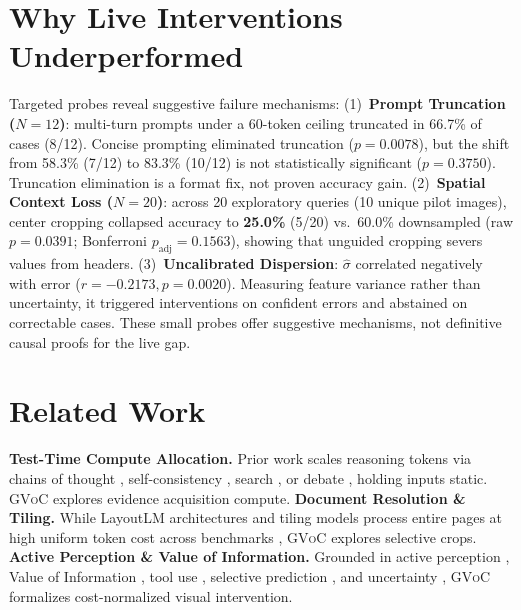 \documentclass[11pt]{article}
\begin{document}
\section{Why Live Interventions Underperformed}
\label{sec:diagnostics}
Targeted probes reveal suggestive failure mechanisms:
(1)~\textbf{Prompt Truncation ($N = 12$)}: multi-turn prompts under a 60-token ceiling truncated in 66.7\% of cases (8/12). Concise prompting eliminated truncation ($p = 0.0078$), but the shift from 58.3\% (7/12) to 83.3\% (10/12) is not statistically significant ($p = 0.3750$). Truncation elimination is a format fix, not proven accuracy gain.
(2)~\textbf{Spatial Context Loss ($N = 20$)}: across 20 exploratory queries (10 unique pilot images), center cropping collapsed accuracy to \textbf{25.0\%} (5/20) vs.\ 60.0\% downsampled (raw $p = 0.0391$; Bonferroni $p_{\text{adj}} = 0.1563$), showing that unguided cropping severs values from headers.
(3)~\textbf{Uncalibrated Dispersion}: $\hat{\sigma}$ correlated negatively with error ($r = -0.2173, p = 0.0020$). Measuring feature variance rather than uncertainty, it triggered interventions on confident errors and abstained on correctable cases. These small probes offer suggestive mechanisms, not definitive causal proofs for the live gap.

\section{Related Work}
\label{sec:related_work}
\textbf{Test-Time Compute Allocation.} Prior work scales reasoning tokens via chains of thought \citep{wei2022chain}, self-consistency \citep{wang2022self}, search \citep{yao2023tree, besta2024graph}, or debate \citep{snell2024scaling, du2023improving, liang2023encouraging, yu2025visual}, holding inputs static. \textsc{GVoC} explores evidence acquisition compute.
\textbf{Document Resolution \& Tiling.} While LayoutLM architectures \citep{xu2020layoutlm, xu2021layoutlmv2, huang2022layoutlmv3, kim2022ocr} and tiling models \citep{appalaraju2021docformer, blecher2023nougat, ye2023ureader, liu2024llavanext} process entire pages at high uniform token cost across benchmarks \citep{mathew2021docvqa, masry2022chartqa, tanaka2021visualmrc, tablebench2024, wang2024mmlongbenchdoc, cui2021document}, \textsc{GVoC} explores selective crops.
\textbf{Active Perception \& Value of Information.} Grounded in active perception \citep{bajcsy1988active}, Value of Information \citep{howard1966information, horvitz1988reasoning, russell1991right}, tool use \citep{schick2023toolformer, suris2023vipergpt, yang2023mm}, selective prediction \citep{geifman2017selective, kamath2020selective}, and uncertainty \citep{hendrycks2017baseline, lakshminarayanan2017simple}, \textsc{GVoC} formalizes cost-normalized visual intervention.
\end{document}
